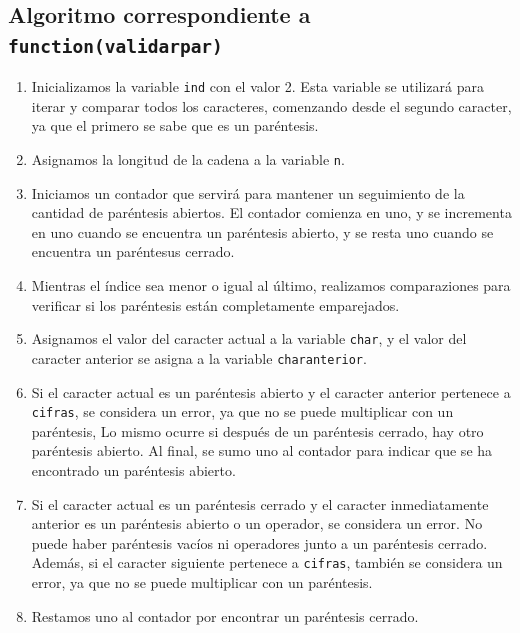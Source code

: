 \documentclass{article}
\begin{document}
\subsection{Algoritmo correspondiente a \texttt{function(validar\textunderscore par)}}
\begin{enumerate}
    \item Inicializamos la variable \texttt{ind} con el valor 2. Esta variable se utilizará para iterar y comparar todos los caracteres, comenzando desde el segundo caracter, ya que el primero se sabe que es un paréntesis. 

    \item Asignamos la longitud de la cadena a la variable \texttt{n}.

    \item Iniciamos un contador que servirá para mantener un seguimiento de la cantidad de paréntesis abiertos. El contador comienza en uno, y se incrementa en uno cuando se encuentra un paréntesis abierto, y se resta uno cuando se encuentra un paréntesus cerrado.

    \item Mientras el índice sea menor o igual al último, realizamos comparaziones para verificar si los paréntesis están completamente emparejados. 

    \item Asignamos el valor del caracter actual a la variable \texttt{char}, y el valor del caracter anterior se asigna a la variable \texttt{char\textunderscore anterior}.

    \item Si el caracter actual es un paréntesis abierto y el caracter anterior pertenece a \texttt{cifras}, se considera un error, ya que no se puede multiplicar con un paréntesis, Lo mismo ocurre si después de un paréntesis cerrado, hay otro paréntesis abierto. Al final, se sumo uno al contador para indicar que se ha encontrado un paréntesis abierto. 

    \item Si el caracter actual es un paréntesis cerrado y el caracter inmediatamente anterior es un paréntesis abierto o un operador, se considera un error. No puede haber paréntesis vacíos ni operadores junto a un paréntesis cerrado. Además, si el caracter siguiente pertenece a \texttt{cifras}, también se considera un error, ya que no se puede multiplicar con un paréntesis. 

    \item Restamos uno al contador por encontrar un paréntesis cerrado. 


\end{enumerate}
\end{document}
